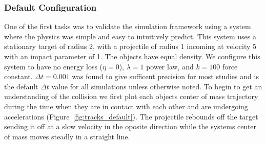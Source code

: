 \documentclass[aps,prl,floatfix,preprint,nofootinbib]{revtex4}
\begin{document}
\subsubsection{Default Configuration}
One of the first tasks was to validate the simulation framework using a system where the physics was simple and easy to intuitively predict. This system uses a stationary target of radius 2, with a projectile of radius 1 incoming at velocity 5 with an impact parameter of 1. The objects have equal density. We configure this system to have no energy loss ($\eta = 0$), $\lambda=1$ power law, and $k=100$ force constant. $\Delta t = 0.001$ was found to give sufficent precision for most studies and is the default $\Delta t$ value for all simulations unless otherwise noted. To begin to get an understanding of the collision we first plot each objects center of mass trajectory during the time when they are in contact with each other and are undergoing accelerations (Figure~\ref{fig:tracks_default}). The projectile rebounds off the target sending it off at a slow velocity in the oposite direction while the systems center of mass moves steadly in a straight line.
\end{document}
